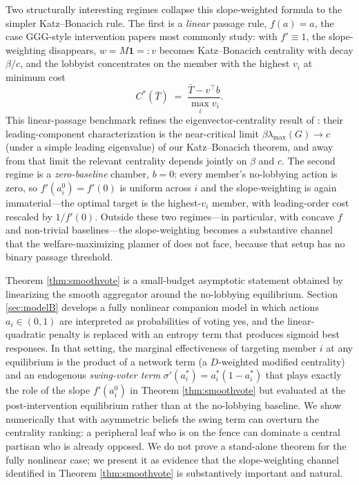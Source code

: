 \documentclass[11pt,letterpaper]{article}
\theoremstyle{plain}
\theoremstyle{definition}
\theoremstyle{remark}
\begin{document}
Two structurally interesting regimes collapse this slope-weighted formula to the simpler Katz--Bonacich rule. The first is a \emph{linear} passage rule, $f(a) = a$, the case GGG-style intervention papers most commonly study: with $f' \equiv 1$, the slope-weighting disappears, $w = M\mathbf{1} =: v$ becomes Katz--Bonacich centrality with decay $\beta/c$, and the lobbyist concentrates on the member with the highest $v_i$ at minimum cost
\[
C^*(\bar T) \;=\; \frac{\bar T - v^\top b}{\max_i v_i}.
\]
This linear-passage benchmark refines the eigenvector-centrality result of \citet{ggg2020}: their leading-component characterization is the near-critical limit $\beta \lambda_{\max}(G) \to c$ (under a simple leading eigenvalue) of our Katz--Bonacich theorem, and away from that limit the relevant centrality depends jointly on $\beta$ and $c$. The second regime is a \emph{zero-baseline} chamber, $b = 0$: every member's no-lobbying action is zero, so $f'(a_i^0) = f'(0)$ is uniform across $i$ and the slope-weighting is again immaterial---the optimal target is the highest-$v_i$ member, with leading-order cost rescaled by $1/f'(0)$. Outside these two regimes---in particular, with concave $f$ and non-trivial baselines---the slope-weighting becomes a substantive channel that the welfare-maximizing planner of \citet{ggg2020} does not face, because that setup has no binary passage threshold.

Theorem \ref{thm:smoothvote} is a small-budget asymptotic statement obtained by linearizing the smooth aggregator around the no-lobbying equilibrium. Section \ref{sec:modelB} develops a fully nonlinear companion model in which actions $a_i \in (0,1)$ are interpreted as probabilities of voting yes, and the linear-quadratic penalty is replaced with an entropy term that produces sigmoid best responses. In that setting, the marginal effectiveness of targeting member $i$ at any equilibrium is the product of a network term (a $D$-weighted modified centrality) and an endogenous \emph{swing-voter term} $\sigma'(a_i^*) = a_i^*(1-a_i^*)$ that plays exactly the role of the slope $f'(a_i^0)$ in Theorem \ref{thm:smoothvote} but evaluated at the post-intervention equilibrium rather than at the no-lobbying baseline. We show numerically that with asymmetric beliefs the swing term can overturn the centrality ranking: a peripheral leaf who is on the fence can dominate a central partisan who is already opposed. We do not prove a stand-alone theorem for the fully nonlinear case; we present it as evidence that the slope-weighting channel identified in Theorem \ref{thm:smoothvote} is substantively important and natural.
\end{document}
